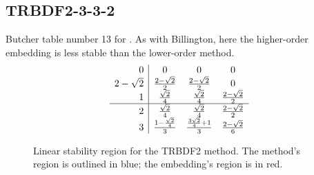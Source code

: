 \documentclass[letterpaper,10pt,english]{sphinxmanual}
\begin{document}
\subsection{TRBDF2-3-3-2}
\label{Butcher:butcher-trbdf2}\label{Butcher:trbdf2-3-3-2}
Butcher table number 13
for {\hyperref[c_interface/User_callable:c.ARKodeSetIRKTableNum]{\emph{}}}.  As with
Billington, here the higher-order embedding is less stable than the
lower-order method.
\begin{gather}
\begin{split}\begin{array}{r|ccc}
  0 & 0 & 0 & 0 \\
  2-\sqrt{2} & \frac{2-\sqrt{2}}{2} & \frac{2-\sqrt{2}}{2} & 0 \\
  1 & \frac{\sqrt{2}}{4} & \frac{\sqrt{2}}{4} & \frac{2-\sqrt{2}}{2} \\
  \hline
  2 & \frac{\sqrt{2}}{4} & \frac{\sqrt{2}}{4} & \frac{2-\sqrt{2}}{2} \\
  3 & \frac{1-\frac{\sqrt{2}}{4}}{3} & \frac{\frac{3\sqrt{2}}{4}+1}{3} & \frac{2-\sqrt{2}}{6}
\end{array}\end{split}\notag
\end{gather}\begin{figure}[htbp]
\centering
\capstart

\caption{Linear stability region for the TRBDF2 method.  The method's
region is outlined in blue; the embedding's region is in red.}\end{figure}
\end{document}
